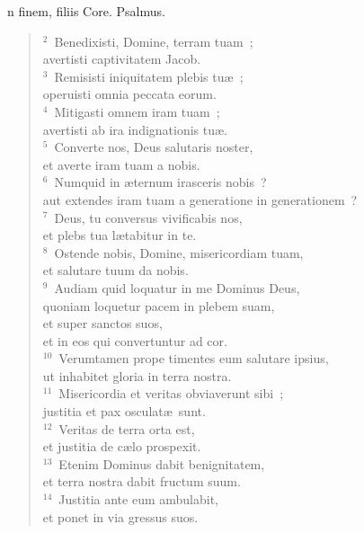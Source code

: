 \bchapter[Psalm]
n finem, filiis Core. Psalmus.
\begin{verse}${}^{2}$~Benedixisti, Domine, terram tuam~;\\ avertisti captivitatem Jacob.\\
${}^{3}$~Remisisti iniquitatem plebis tu\ae~;\\ operuisti omnia peccata eorum.\\
${}^{4}$~Mitigasti omnem iram tuam~;\\ avertisti ab ira indignationis tu\ae .\\
${}^{5}$~Converte nos, Deus salutaris noster,\\ et averte iram tuam a nobis.\\
${}^{6}$~Numquid in \ae ternum irasceris nobis~?\\ aut extendes iram tuam a generatione in generationem~?\\
${}^{7}$~Deus, tu conversus vivificabis nos,\\ et plebs tua l\ae tabitur in te.\\
${}^{8}$~Ostende nobis, Domine, misericordiam tuam,\\ et salutare tuum da nobis.\\
${}^{9}$~Audiam quid loquatur in me Dominus Deus,\\ quoniam loquetur pacem in plebem suam,\\ et super sanctos suos,\\ et in eos qui convertuntur ad cor.\\
${}^{10}$~Verumtamen prope timentes eum salutare ipsius,\\ ut inhabitet gloria in terra nostra.\\
${}^{11}$~Misericordia et veritas obviaverunt sibi~;\\ justitia et pax osculat\ae\ sunt.\\
${}^{12}$~Veritas de terra orta est,\\ et justitia de c\ae lo prospexit.\\
${}^{13}$~Etenim Dominus dabit benignitatem,\\ et terra nostra dabit fructum suum.\\
${}^{14}$~Justitia ante eum ambulabit,\\ et ponet in via gressus suos.\end{verse}




